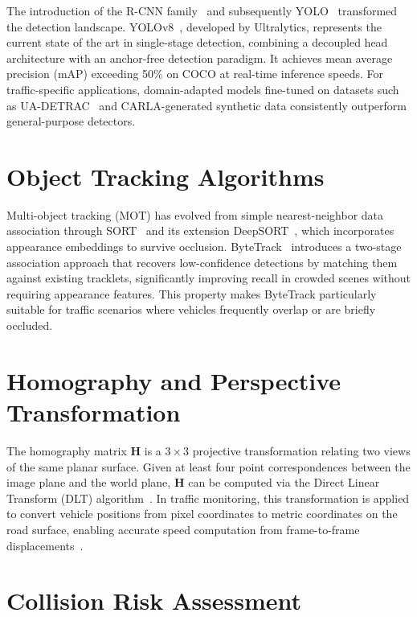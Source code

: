 \documentclass[12pt]{report}
\begin{document}
The introduction of the R-CNN family~\cite{Girshick2014} and subsequently YOLO~\cite{Redmon2016} transformed the detection landscape.
YOLOv8~\cite{Jocher2023}, developed by Ultralytics, represents the current state of the art in single-stage detection, combining a decoupled head architecture with an anchor-free detection paradigm.
It achieves mean average precision (mAP) exceeding 50\% on COCO at real-time inference speeds.
For traffic-specific applications, domain-adapted models fine-tuned on datasets such as UA-DETRAC~\cite{Wen2020} and CARLA-generated synthetic data consistently outperform general-purpose detectors.

\section{Object Tracking Algorithms}

Multi-object tracking (MOT) has evolved from simple nearest-neighbor data association through SORT~\cite{Bewley2016} and its extension DeepSORT~\cite{Wojke2017}, which incorporates appearance embeddings to survive occlusion.
ByteTrack~\cite{Zhang2022} introduces a two-stage association approach that recovers low-confidence detections by matching them against existing tracklets, significantly improving recall in crowded scenes without requiring appearance features.
This property makes ByteTrack particularly suitable for traffic scenarios where vehicles frequently overlap or are briefly occluded.

\section{Homography and Perspective Transformation}

The homography matrix $\mathbf{H}$ is a $3 \times 3$ projective transformation relating two views of the same planar surface.
Given at least four point correspondences between the image plane and the world plane, $\mathbf{H}$ can be computed via the Direct Linear Transform (DLT) algorithm~\cite{Hartley2004}.
In traffic monitoring, this transformation is applied to convert vehicle positions from pixel coordinates to metric coordinates on the road surface, enabling accurate speed computation from frame-to-frame displacements~\cite{Schoepflin2003}.

\section{Collision Risk Assessment}
\end{document}
